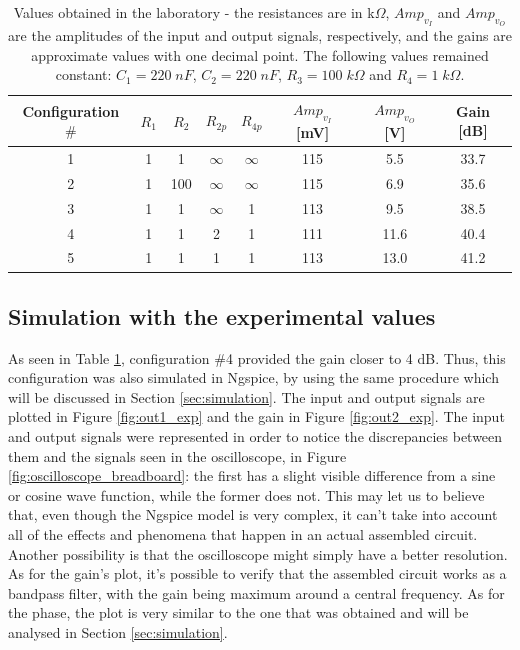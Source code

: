 \begin{table}[H]
  \centering
  \begin{tabular}{|c|c|c|c|c|c|c|c|}
    \hline
    Configuration $\#$ & $R_1$ & $R_2$ & $R_{2p}$ & $R_{4p}$ & $Amp_{v_I}$ [mV] & $Amp_{v_O}$ [V] & Gain [dB]\\
    \hline
    1 & 1 & 1 & $\infty$ & $\infty$ & 115 & 5.5 & 33.7 \\
    2 & 1 & 100 & $\infty$ & $\infty$ & 115 & 6.9 & 35.6 \\
    3 & 1 & 1 & $\infty$ & 1 & 113 & 9.5 & 38.5 \\
    4 & 1 & 1 & 2 & 1 & 111 & 11.6 & 40.4 \\
    5 & 1 & 1 & 1 & 1 & 113 & 13.0 & 41.2 \\
    \hline
  \end{tabular}
  \caption{Values obtained in the laboratory - the resistances are in k$\Omega$, $Amp_{v_I}$ and $Amp_{v_O}$ are the amplitudes of the input and output signals, respectively, and the gains are approximate values with one decimal point. The following values remained constant: $C_1=220\;nF$, $C_2=220\;nF$, $R_3=100\;k\Omega$ and $R_4=1\;k\Omega$.}
  \label{tab:lab_results}
\end{table}

\subsection{Simulation with the experimental values}

As seen in Table \ref{tab:lab_results}, configuration $\#$4 provided the gain closer to 4 dB. Thus, this configuration was also simulated in Ngspice, by using the same procedure which will be discussed in Section \ref{sec:simulation}. The input and output signals are plotted in Figure \ref{fig:out1_exp} and the gain in Figure \ref{fig:out2_exp}. The input and output signals were represented in order to notice the discrepancies between them and the signals seen in the oscilloscope, in Figure \ref{fig:oscilloscope_breadboard}: the first has a slight visible difference from a sine or cosine wave function, while the former does not. This may let us to believe that, even though the Ngspice model is very complex, it can't take into account all of the effects and phenomena that happen in an actual assembled circuit. Another possibility is that the oscilloscope might simply have a better resolution. As for the gain's plot, it's possible to verify that the assembled circuit works as a bandpass filter, with the gain being maximum around a central frequency. As for the phase, the plot is very similar to the one that was obtained and will be analysed in Section \ref{sec:simulation}.

